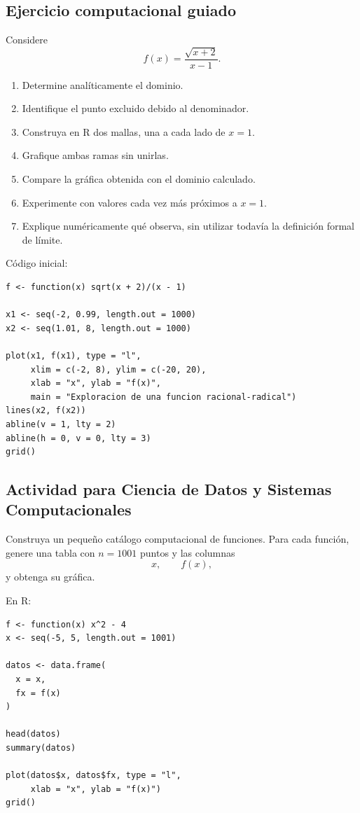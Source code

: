 \documentclass[12pt]{article}
\theoremstyle{remark}
\begin{document}
\subsection{Ejercicio computacional guiado}

Considere
\[
f(x)=\frac{\sqrt{x+2}}{x-1}.
\]

\begin{enumerate}
    \item Determine analíticamente el dominio.
    \item Identifique el punto excluido debido al denominador.
    \item Construya en R dos mallas, una a cada lado de $x=1$.
    \item Grafique ambas ramas sin unirlas.
    \item Compare la gráfica obtenida con el dominio calculado.
    \item Experimente con valores cada vez más próximos a $x=1$.
    \item Explique numéricamente qué observa, sin utilizar todavía la definición
    formal de límite.
\end{enumerate}

Código inicial:

\begin{verbatim}
f <- function(x) sqrt(x + 2)/(x - 1)

x1 <- seq(-2, 0.99, length.out = 1000)
x2 <- seq(1.01, 8, length.out = 1000)

plot(x1, f(x1), type = "l",
     xlim = c(-2, 8), ylim = c(-20, 20),
     xlab = "x", ylab = "f(x)",
     main = "Exploracion de una funcion racional-radical")
lines(x2, f(x2))
abline(v = 1, lty = 2)
abline(h = 0, v = 0, lty = 3)
grid()
\end{verbatim}

\subsection{Actividad para Ciencia de Datos y Sistemas Computacionales}

Construya un pequeño catálogo computacional de funciones. Para cada función,
genere una tabla con $n=1001$ puntos y las columnas
\[
x,\qquad f(x),
\]
y obtenga su gráfica.

En R:

\begin{verbatim}
f <- function(x) x^2 - 4
x <- seq(-5, 5, length.out = 1001)

datos <- data.frame(
  x = x,
  fx = f(x)
)

head(datos)
summary(datos)

plot(datos$x, datos$fx, type = "l",
     xlab = "x", ylab = "f(x)")
grid()
\end{verbatim}
\end{document}
